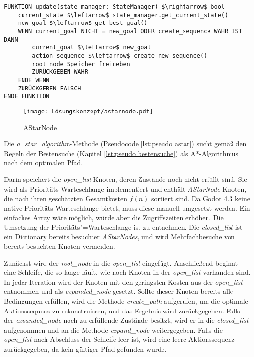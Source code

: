 \begin{lstlisting}[language=Pseudo, caption={update Methode des GoapPlanner}, mathescape=true, label={lst:pseudo planner update}]
FUNKTION update(state_manager: StateManager) $\rightarrow$ bool
    current_state $\leftarrow$ state_manager.get_current_state()
    new_goal $\leftarrow$ get_best_goal()
    WENN current_goal NICHT = new_goal ODER create_sequence WAHR IST DANN
        current_goal $\leftarrow$ new_goal
        action_sequence $\leftarrow$ create_new_sequence()
        root_node Speicher freigeben
        ZURÜCKGEBEN WAHR
    ENDE WENN
    ZURÜCKGEBEN FALSCH
ENDE FUNKTION
\end{lstlisting}

\begin{figure}[h]
  \centering
  \texttt{[image: Lösungskonzept/astarnode.pdf]}
	\captionsetup{justification=justified, format=plain}
  \caption{AStarNode}
  \label{fig:AStarNode}
\end{figure}

Die \textit{a\_star\_algorithm}-Methode (Pseudocode \ref{lst:pseudo astar}) sucht gemäß den Regeln der Bestensuche (Kapitel \ref{lst:pseudo bestensuche}) als A*-Algorithmus nach dem optimalen Pfad.

Darin speichert die \textit{open\_list} Knoten, deren Zustände noch nicht erfüllt sind. Sie wird als Prioritäts-Warteschlange implementiert und enthält \textit{AStarNode}-Knoten, die nach ihren geschätzten Gesamtkosten $f(n)$ sortiert sind. Da Godot 4.3 keine native Prioritäts-Warteschlange bietet, muss diese manuell umgesetzt werden. Ein einfaches Array wäre möglich, würde aber die Zugriffszeiten erhöhen. Die Umsetzung der Prioritäts"=Warteschlange ist \autocite{oleg} zu entnehmen. Die \textit{closed\_list} ist ein Dictionary bereits besuchter \textit{AStarNodes}, und wird Mehrfachbesuche von bereits besuchten Knoten vermeiden. 

Zunächst wird der \textit{root\_node} in die \textit{open\_list} eingefügt. Anschließend beginnt eine Schleife, die so lange läuft, wie noch Knoten in der \textit{open\_list} vorhanden sind. In jeder Iteration wird der Knoten mit den geringsten Kosten aus der \textit{open\_list} entnommen und als \textit{expanded\_node} gesetzt. Sollte dieser Knoten bereits alle Bedingungen erfüllen, wird die Methode \textit{create\_path} aufgerufen, um die optimale Aktionssequenz zu rekonstruieren, und das Ergebnis wird zurückgegeben. Falls der \textit{expanded\_node} noch zu erfüllende Zustände besitzt, wird er in die \textit{closed\_list} aufgenommen und an die Methode \textit{expand\_node} weitergegeben. Falls die \textit{open\_list} nach Abschluss der Schleife leer ist, wird eine leere Aktionssequenz zurückgegeben, da kein gültiger Pfad gefunden wurde.

